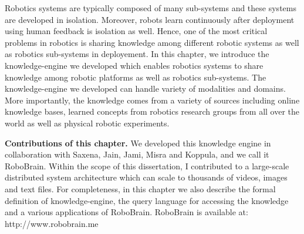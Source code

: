 
Robotics systems are typically composed of many sub-systems and these systems are developed in isolation. Moreover, robots learn continuously after deployment using human feedback is isolation as well. Hence, one of the most critical problems in robotics is sharing knowledge among different robotic systems as well as robotics sub-systems in deployement. In this chapter, we introduce the knowledge-engine we developed which enables robotics systems to share knowledge among robotic platforms as well as robotics sub-systems. The knowledge-engine we developed can handle variety of modalities and domains. More importantly, the knowledge comes from a variety of sources including online knowledge bases, learned concepts from robotics research groups from all over the world as well as physical robotic experiments.

\noindent\textbf{Contributions of this chapter.} We developed this knowledge engine in collaboration with Saxena, Jain, Jami, Misra and Koppula, and we call it RoboBrain. Within the scope of this dissertation, I contributed to a large-scale distributed system architecture which can scale to thousands of videos, images and text files. For completeness, in this chapter we also describe the formal definition of knowledge-engine, the query language for accessing the knowledge and a various applications of RoboBrain. RoboBrain is available at: http://www.robobrain.me





















